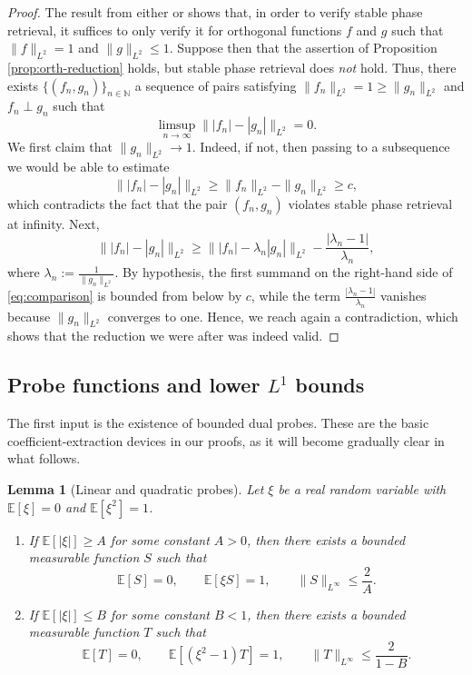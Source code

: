\documentclass[11pt]{amsart}
\numberwithin{equation}{section}
\newtheorem{lemma}[theorem]{Lemma}
\theoremstyle{definition}
\theoremstyle{remark}
\newcommand{\E}{\mathbb E}
\newcommand{\N}{\mathbb N}
\newcommand{\abs}[1]{\lvert #1 \rvert}
\newcommand{\norm}[1]{\lVert #1 \rVert}
\begin{document}
\begin{proof} The result from either \cite[Theorem~3.9]{FOTP} or \cite[Theorem~2.1]{localphase} shows that, in order to verify stable phase retrieval, it suffices to only verify it for orthogonal functions $f$ and $g$ such that $\|f\|_{L^2}=1$ and $\|g\|_{L^2}\le 1$. Suppose then that the assertion of Proposition \ref{prop:orth-reduction} holds, but stable phase retrieval does \emph{not} hold. Thus, there exists $\{(f_n,g_n)\}_{n \in \N}$ a sequence of pairs satisfying $\|f_n\|_{L^2} = 1 \geq \|g_n\|_{L^2}$ and $f_n \perp g_n$ such that
\[
\limsup_{n \to \infty} \| |f_n| - |g_n| \|_{L^2} = 0.
\]
We first claim that $\|g_n\|_{L^2} \to 1.$ Indeed, if not, then passing to a subsequence we would be able to estimate 
\[
\||f_n| - |g_n|\|_{L^2} \geq \|f_n\|_{L^2} - \|g_n\|_{L^2} \ge c,
\]
which contradicts the fact that the pair $(f_n,g_n)$ violates stable phase retrieval at infinity. Next,  
\begin{equation}\label{eq:comparison}
\||f_n| - |g_n|\|_{L^2} \geq \| |f_n| - \lambda_n |g_n|\|_{L^2} - \frac{|\lambda_n - 1|}{\lambda_n},
\end{equation}
where $\lambda_n := \frac{1}{\|g_n\|_{L^2}}.$ By hypothesis, the first summand on the right-hand side of \eqref{eq:comparison} is bounded from below by $c$, while the term $\frac{|\lambda_n - 1|}{\lambda_n}$ vanishes because $\|g_n\|_{L^2}$ converges to one. Hence, we reach again a contradiction, which shows that the reduction we were after was indeed valid. 
\end{proof}



\subsection{Probe functions and lower $L^1$ bounds}

The first input is the existence of bounded dual probes.  These are the basic
coefficient-extraction devices in our proofs, as it will become gradually clear in what follows.

\begin{lemma}[Linear and quadratic probes]\label{lem:probes}
Let $\xi$ be a real random variable with $\E[\xi]=0$ and $\E[\xi^2]=1$.

\begin{enumerate}[label=\rm(\arabic*)]
\item If $\E[\abs{\xi}]\ge A$ for some constant $A>0$, then there exists a bounded measurable
function $S$ such that
\[
\E[S]=0,
\qquad
\E[\xi S]=1,
\qquad
\norm{S}_{L^\infty}\le \frac{2}{A}.
\]
\item If $\E[\abs{\xi}]\le B$ for some constant $B<1$, then there exists a bounded measurable
function $T$ such that
\[
\E[T]=0,
\qquad
\E[(\xi^2-1)T]=1,
\qquad
\norm{T}_{L^\infty}\le \frac{2}{1-B}.
\]
\end{enumerate}
\end{lemma}
\end{document}
